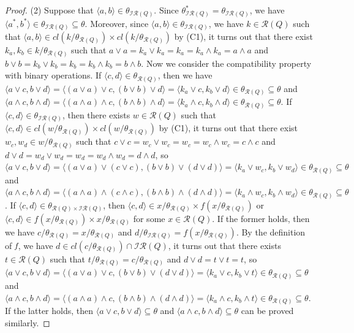 \documentclass[12pt]{amsart}
\theoremstyle{definition}
\theoremstyle{remark}
\numberwithin{equation}{section}
\begin{document}
\begin{proof}
(2) Suppose that $\langle a,b\rangle\in \theta_{\mathscr{IR}(Q)}$. Since $\theta_{\mathscr{IR}(Q)}^{\ast}=\theta_{\mathscr{IR}(Q)}$, we have $\langle a^{\ast},b^{\ast}\rangle\in \theta_{\mathscr{IR}(Q)}\subseteq \theta$. Moreover, since $\langle a,b\rangle\in \theta_{\mathscr{IR}(Q)}$, we have $k\in \mathscr{R}(Q)$ such that $\langle a,b\rangle\in cl(k/\theta_{\mathscr{R}(Q)})\times cl(k/\theta_{\mathscr{R}(Q)})$ by (C1), it turns out that there exist $k_{a},k_{b}\in k/\theta_{\mathscr{R}(Q)}$ such that $a\vee a=k_{a}\vee k_{a}=k_{a}=k_{a}\wedge k_{a}=a\wedge a$ and $b\vee b=k_{b}\vee k_{b}=k_{b}=k_{b}\wedge k_{b}=b\wedge b$. Now we consider the compatibility property with binary operations. If $\langle c,d\rangle\in \theta_{\mathscr{R}(Q)}$, then we have $\langle a\vee c,b \vee d\rangle=\langle (a\vee a)\vee c,(b \vee b)\vee d\rangle=\langle k_{a}\vee c ,k_{b}\vee d \rangle\in \theta_{\mathscr{R}(Q)}\subseteq \theta$ and $\langle a\wedge c,b \wedge d\rangle=\langle (a\wedge a)\wedge c,(b \wedge b)\wedge d\rangle=\langle k_{a}\wedge c,k_{b} \wedge d\rangle\in \theta_{\mathscr{R}(Q)}\subseteq \theta$. If $\langle c,d\rangle\in \theta_{\mathscr{IR}(Q)}$, then there exists $w\in \mathscr{R}(Q)$ such that $\langle c,d\rangle\in cl(w/\theta_{\mathscr{R}(Q)})\times cl(w/\theta_{\mathscr{R}(Q)})$ by (C1), it turns out that there exist $w_{c},w_{d}\in w/\theta_{\mathscr{R}(Q)}$ such that $c\vee c=w_{c}\vee w_{c}=w_{c}=w_{c}\wedge w_{c}=c\wedge c$ and $d\vee d=w_{d}\vee w_{d}=w_{d}=w_{d}\wedge w_{d}=d\wedge d$, so $\langle a\vee c,b\vee d\rangle=\langle (a\vee a)\vee (c\vee c),(b\vee b)\vee (d\vee d)\rangle=\langle k_{a}\vee w_{c},k_{b}\vee w_{d}\rangle\in \theta_{\mathscr{R}(Q)}\subseteq \theta$ and $\langle a\wedge c,b\wedge d\rangle=\langle (a\wedge a)\wedge (c\wedge c),(b\wedge b)\wedge (d\wedge d)\rangle=\langle k_{a}\wedge w_{c},k_{b}\wedge w_{d}\rangle\in \theta_{\mathscr{R}(Q)}\subseteq \theta$.
If $\langle c,d\rangle\in \theta_{\mathscr{R}(Q)\times \mathscr{IR}(Q)}$, then $\langle c,d\rangle\in x/\theta_{\mathscr{R}(Q)}\times f(x/\theta_{\mathscr{R}(Q)})$ or
$\langle c,d\rangle\in f(x/\theta_{\mathscr{R}(Q)})\times x/\theta_{\mathscr{R}(Q)}$ for some $x\in \mathscr{R}(Q)$. If the former holds,
then we have $c/\theta_{\mathscr{R}(Q)}=x/\theta_{\mathscr{R}(Q)}$ and $d/\theta_{\mathscr{IR}(Q)}=f(x/\theta_{\mathscr{R}(Q)})$.
By the definition of $\emph{f}$, we have $d\in cl(c/\theta_{\mathscr{R}(Q)})\cap \mathscr{IR}(Q)$, it turns out that there exists $t\in \mathscr{R}(Q)$ such that $t/\theta_{\mathscr{R}(Q)}= c/\theta_{\mathscr{R}(Q)}$ and $d\vee d=t\vee t=t$, so $\langle a\vee c,b\vee d\rangle=\langle (a\vee a)\vee c,(b\vee b)\vee (d\vee d)\rangle=\langle k_{a}\vee c,k_{b}\vee t\rangle\in \theta_{\mathscr{R}(Q)}\subseteq \theta$ and $\langle a\wedge c, b \wedge d\rangle=\langle (a\wedge a)\wedge c, (b\wedge b)\wedge (d\wedge d)\rangle=\langle k_{a}\wedge c, k_{b}\wedge t\rangle \in \theta_{\mathscr{R}(Q)}\subseteq \theta$.
If the latter holds, then $\langle a\vee c,b\vee d\rangle\subseteq \theta$ and $\langle a\wedge c,b\wedge d\rangle\subseteq \theta$ can be proved similarly.



\end{proof}
\end{document}
